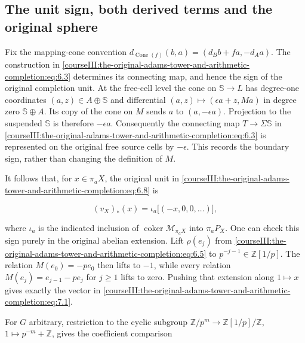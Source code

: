 \subsection{The unit sign, both derived terms and the original sphere}
\label{courseIII:the-original-adams-tower-and-arithmetic-completion:arithmetic-homotopy-groups}

\label{courseIII:the-original-adams-tower-and-arithmetic-completion:section-7}\label{courseIII:adams-arithmetic:7}

Fix the mapping-cone convention
\(d_{\operatorname{Cone}(f)}(b,a)=(d_Bb+fa,-d_Aa)\).
The construction in \eqref{courseIII:the-original-adams-tower-and-arithmetic-completion:eq:6.3} determines its connecting map, and hence the sign of the original completion unit. At the free-cell level the cone on \(\mathbb S\to L\) has degree-one coordinates \((a,z)\in A\oplus\mathbb S\) and differential
\((a,z)\mapsto(\epsilon a+z,Ma)\) in degree zero \(\mathbb S\oplus A\). Its copy of the cone on \(M\) sends \(a\) to \((a,-\epsilon a)\). Projection to the suspended \(\mathbb S\) is therefore \(-\epsilon a\). Consequently the connecting map \(T\to\Sigma\mathbb S\) in \eqref{courseIII:the-original-adams-tower-and-arithmetic-completion:eq:6.3} is represented on the original free source cells by \(-\epsilon\). This records the boundary sign, rather than changing the definition of \(M\).

It follows that, for \(x\in\pi_aX\), the original unit in \eqref{courseIII:the-original-adams-tower-and-arithmetic-completion:eq:6.8} is

\begin{equation}
(v_X)_*(x)=\iota_a\bigl[(-x,0,0,\ldots)\bigr],
\label{courseIII:the-original-adams-tower-and-arithmetic-completion:eq:7.1}
\end{equation}

where \(\iota_a\) is the indicated inclusion of
\(\operatorname{coker}\mathcal M_{\pi_aX}\) into \(\pi_aP_X\).
One can check this sign purely in the original abelian extension. Lift \(\rho(e_j)\) from \eqref{courseIII:the-original-adams-tower-and-arithmetic-completion:eq:6.5} to \(p^{-j-1}\in\mathbb Z[1/p]\). The relation \(M(e_0)=-pe_0\) then lifts to \(-1\), while every relation \(M(e_j)=e_{j-1}-pe_j\) for \(j\geq1\) lifts to zero. Pushing that extension along \(1\mapsto x\) gives exactly the vector in \eqref{courseIII:the-original-adams-tower-and-arithmetic-completion:eq:7.1}.

For \(G\) arbitrary, restriction to the cyclic subgroup
\(\mathbb Z/p^m\to\mathbb Z[1/p]/\mathbb Z\), \(1\mapsto p^{-m}+\mathbb Z\), gives the coefficient comparison

